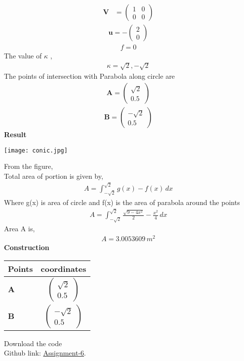 \documentclass[10pt,a4paper]{report}
\newcommand{\myvec}[1]{\ensuremath{\begin{pmatrix}#1\end{pmatrix}}}
\let\vec\mathbf
\let\vec\mathbf
\begin{document}
\begin{multicols}{2}
\begin{align}
	\vec{V} &= \myvec{
1 & 0\\
0 & 0
    }
\end{align}
\begin{align}
	\vec{u} = -\myvec{2 \\0}
 \end{align}
 \begin{align}
  f = 0
 \end{align}
The value of $\kappa$ ,\\
\begin{align}
    \kappa = \sqrt{2},-\sqrt{2}
\end{align}
The points of intersection with Parabola along circle are \\
\begin{align}
    \vec{A}=\myvec{
\sqrt{2}\\
0.5
    }
\end{align}
\begin{align}
    \vec{B}=\myvec{
-\sqrt{2}\\
0.5
    }
\end{align}
\textbf{Result}
\begin{center}
 \texttt{[image: conic.jpg]}  
 \end{center}\vspace{1mm}
 From the figure,\\ \vspace{1mm}
Total area of portion is given by, \\ \vspace{1mm}
\begin{align}
 A=  \int_{-\sqrt{2}}^{\sqrt{2}} g(x)-f(x) \,dx 
\end{align}
Where g(x) is area of circle and f(x) is the area of parabola around the points\\ \vspace{1mm}
\begin{align}
A= \int_{-\sqrt{2}}^{\sqrt{2}} \frac{\sqrt{9-4x^2}}{2}-\frac{x^2}{4} \,dx 
\end{align}
Area A is,\\ 
\begin{align}
    A= 3.0053609 \,m^2
\end{align}
 \vspace{2mm} \textbf{Construction}
\begin{center}
\setlength{\arrayrulewidth}{0.5mm}
\setlength{\tabcolsep}{6pt}
\renewcommand{\arraystretch}{1.5}
    \begin{tabular}{|l|c|}
    \hline 
    \textbf{Points} & \textbf{coordinates} \\ \hline
   $\vec{A}$ & $\myvec{
   \sqrt{2}\\
   0.5
   } $ \\\hline
   $\vec{B}$ & $\myvec{
   -\sqrt{2}\\
   0.5
   } $ \\\hline
      \end{tabular}
  \end{center}

\raggedright  Download the code \\
Github link: \href{https://github.com/chiragshah1244/FWC/blob/main/assignments/assignment_6/code_conic/conic.py}{Assignment-6}.
  \end{multicols}
\end{document}
